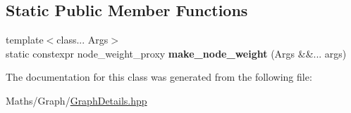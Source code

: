 \subsection*{Static Public Member Functions}
\begin{DoxyCompactItemize}
\item 
\mbox{\label{classsequoia_1_1maths_1_1graph__impl_1_1weight__maker_3_01_node_weight_pooling_00_01_edge_weightf3288a9dc2dbbbb7cec12cb6a57911c5_a394ba12af65a618ec3b5ce084f37662d}} 
{\footnotesize template$<$class... Args$>$ }\\static constexpr node\+\_\+weight\+\_\+proxy {\bfseries make\+\_\+node\+\_\+weight} (Args \&\&... args)
\end{DoxyCompactItemize}


The documentation for this class was generated from the following file\+:\begin{DoxyCompactItemize}
\item 
Maths/\+Graph/\mbox{\hyperlink{_graph_details_8hpp}{Graph\+Details.\+hpp}}\end{DoxyCompactItemize}
